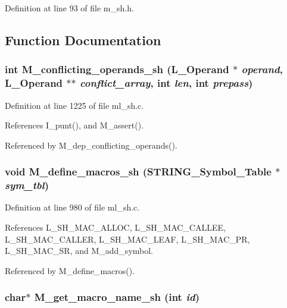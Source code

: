 Definition at line 93 of file m\_\-sh.h.

\subsection{Function Documentation}
\subsubsection{\setlength{\rightskip}{0pt plus 5cm}int M\_\-conflicting\_\-operands\_\-sh (L\_\-Operand $\ast$ {\em operand}, L\_\-Operand $\ast$$\ast$ {\em conflict\_\-array}, int {\em len}, int {\em prepass})}\label{m__sh_8h_d2727b3ac02e4028cefb7ad7a021ae0a}




Definition at line 1225 of file ml\_\-sh.c.

References I\_\-punt(), and M\_\-assert().

Referenced by M\_\-dep\_\-conflicting\_\-operands().
\subsubsection{\setlength{\rightskip}{0pt plus 5cm}void M\_\-define\_\-macros\_\-sh (\bf{STRING\_\-Symbol\_\-Table} $\ast$ {\em sym\_\-tbl})}\label{m__sh_8h_e9100476b339222b55e32457d5f1ae1a}




Definition at line 980 of file ml\_\-sh.c.

References L\_\-SH\_\-MAC\_\-ALLOC, L\_\-SH\_\-MAC\_\-CALLEE, L\_\-SH\_\-MAC\_\-CALLER, L\_\-SH\_\-MAC\_\-LEAF, L\_\-SH\_\-MAC\_\-PR, L\_\-SH\_\-MAC\_\-SR, and M\_\-add\_\-symbol.

Referenced by M\_\-define\_\-macros().
\subsubsection{\setlength{\rightskip}{0pt plus 5cm}char$\ast$ M\_\-get\_\-macro\_\-name\_\-sh (int {\em id})}\label{m__sh_8h_f24bd33e76bbaed279abf488b0706bb2}




